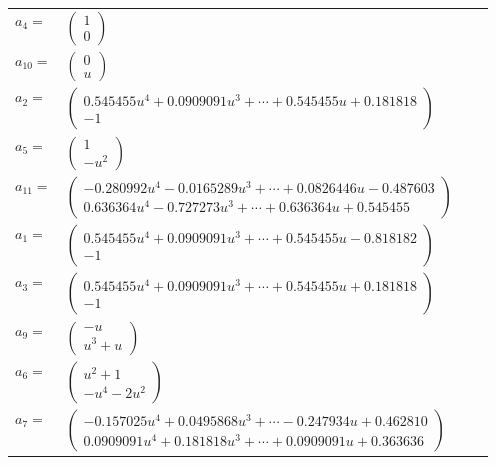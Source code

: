 \documentclass[1p]{elsarticle_modified}
\theoremstyle{definition}
\begin{document}
\begin{tabular}{m{7pt} m{180pt} m{7pt} m{180pt} }
\flushright $a_{4}=$&$\begin{pmatrix}1\\0\end{pmatrix}$ \\
\flushright $a_{10}=$&$\begin{pmatrix}0\\u\end{pmatrix}$ \\
\flushright $a_{2}=$&$\begin{pmatrix}0.545455 u^{4}+0.0909091 u^{3}+\cdots+0.545455 u+0.181818\\-1\end{pmatrix}$ \\
\flushright $a_{5}=$&$\begin{pmatrix}1\\- u^2\end{pmatrix}$ \\
\flushright $a_{11}=$&$\begin{pmatrix}-0.280992 u^{4}-0.0165289 u^{3}+\cdots+0.0826446 u-0.487603\\0.636364 u^{4}-0.727273 u^{3}+\cdots+0.636364 u+0.545455\end{pmatrix}$ \\
\flushright $a_{1}=$&$\begin{pmatrix}0.545455 u^{4}+0.0909091 u^{3}+\cdots+0.545455 u-0.818182\\-1\end{pmatrix}$ \\
\flushright $a_{3}=$&$\begin{pmatrix}0.545455 u^{4}+0.0909091 u^{3}+\cdots+0.545455 u+0.181818\\-1\end{pmatrix}$ \\
\flushright $a_{9}=$&$\begin{pmatrix}- u\\u^3+u\end{pmatrix}$ \\
\flushright $a_{6}=$&$\begin{pmatrix}u^2+1\\- u^4-2 u^2\end{pmatrix}$ \\
\flushright $a_{7}=$&$\begin{pmatrix}-0.157025 u^{4}+0.0495868 u^{3}+\cdots-0.247934 u+0.462810\\0.0909091 u^{4}+0.181818 u^{3}+\cdots+0.0909091 u+0.363636\end{pmatrix}$ \\

\end{tabular}
\end{document}
